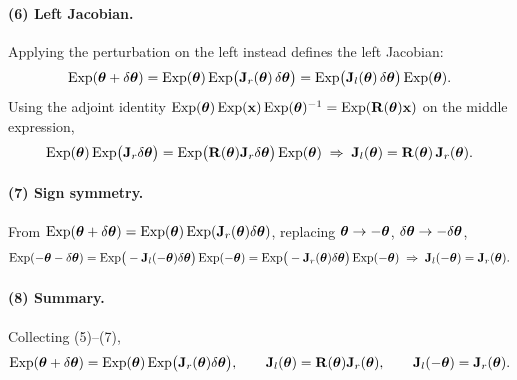 \paragraph{(6) Left Jacobian.} Applying the perturbation on the left instead defines the left Jacobian:
\begin{align}
\Exp(\vect{\theta}+\delta\vect{\theta}) = \Exp(\vect{\theta})\Exp\!\big(\vect{J}_r(\vect{\theta})\,\delta\vect{\theta}\big) = \Exp\!\big(\vect{J}_l(\vect{\theta})\,\delta\vect{\theta}\big)\Exp(\vect{\theta}).
\end{align}
Using the adjoint identity $\Exp(\vect{\theta})\Exp(\vect{x})\Exp(\vect{\theta})^{-1} = \Exp(\vect{R}(\vect{\theta})\vect{x})$ on the middle expression,
\begin{align}
\Exp(\vect{\theta})\Exp\!\big(\vect{J}_r\delta\vect{\theta}\big) = \Exp\!\big(\vect{R}(\vect{\theta})\vect{J}_r\delta\vect{\theta}\big)\Exp(\vect{\theta})
\;\Rightarrow\;
\vect{J}_l(\vect{\theta}) = \vect{R}(\vect{\theta})\,\vect{J}_r(\vect{\theta}).
\end{align}

\paragraph{(7) Sign symmetry.} From $\Exp(\vect{\theta}+\delta\vect{\theta}) = \Exp(\vect{\theta})\Exp(\vect{J}_r(\vect{\theta})\delta\vect{\theta})$, replacing $\vect{\theta}\to-\vect{\theta}$, $\delta\vect{\theta}\to-\delta\vect{\theta}$,
\begin{align}
\Exp(-\vect{\theta}-\delta\vect{\theta}) = \Exp\!\big(-\vect{J}_l(-\vect{\theta})\delta\vect{\theta}\big)\Exp(-\vect{\theta}) = \Exp\!\big(-\vect{J}_r(\vect{\theta})\delta\vect{\theta}\big)\Exp(-\vect{\theta})
\;\Rightarrow\;
\vect{J}_l(-\vect{\theta}) = \vect{J}_r(\vect{\theta}).
\end{align}

\paragraph{(8) Summary.} Collecting (5)--(7),
\begin{align}
\Exp(\vect{\theta}+\delta\vect{\theta}) = \Exp(\vect{\theta})\Exp\!\big(\vect{J}_r(\vect{\theta})\delta\vect{\theta}\big), \qquad
\vect{J}_l(\vect{\theta}) = \vect{R}(\vect{\theta})\vect{J}_r(\vect{\theta}), \qquad
\vect{J}_l(-\vect{\theta}) = \vect{J}_r(\vect{\theta}).
\end{align}

